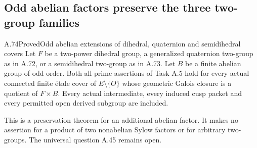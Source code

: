 \subsection{Odd abelian factors preserve the three two-group families}

\begin{statement}{A.74}{Proved}{Odd abelian extensions of dihedral, quaternion and semidihedral covers}
Let \(F\) be a two-power dihedral group, a generalized
quaternion two-group as in A.72, or a semidihedral two-group
as in A.73. Let \(B\) be a finite abelian group of odd order.
Both all-prime assertions of Task A.5 hold for every actual
connected finite \'{e}tale cover of \(E\setminus\{O\}\)
whose geometric Galois closure is a quotient of \(F\times B\).
Every actual intermediate, every induced cusp packet and
every permitted open derived subgroup are included.

This is a preservation theorem for an additional abelian
factor. It makes no assertion for a product of two nonabelian
Sylow factors or for arbitrary two-groups. The universal
question A.45 remains open.
\end{statement}

